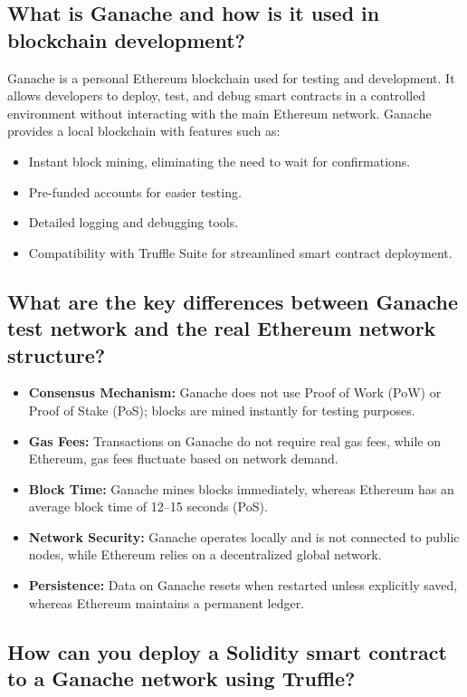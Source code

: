 \documentclass[11pt]{article}
\begin{document}
\subsection{What is Ganache and how is it used in blockchain development?}

Ganache is a personal Ethereum blockchain used for testing and development. It allows developers to deploy, test, and debug smart contracts in a controlled environment without interacting with the main Ethereum network. Ganache provides a local blockchain with features such as:
\begin{itemize}
    \item Instant block mining, eliminating the need to wait for confirmations.
    \item Pre-funded accounts for easier testing.
    \item Detailed logging and debugging tools.
    \item Compatibility with Truffle Suite for streamlined smart contract deployment.
\end{itemize}

\subsection{What are the key differences between Ganache test network and the real Ethereum network structure?}

\begin{itemize}
    \item \textbf{Consensus Mechanism:} Ganache does not use Proof of Work (PoW) or Proof of Stake (PoS); blocks are mined instantly for testing purposes.
    \item \textbf{Gas Fees:} Transactions on Ganache do not require real gas fees, while on Ethereum, gas fees fluctuate based on network demand.
    \item \textbf{Block Time:} Ganache mines blocks immediately, whereas Ethereum has an average block time of 12–15 seconds (PoS).
    \item \textbf{Network Security:} Ganache operates locally and is not connected to public nodes, while Ethereum relies on a decentralized global network.
    \item \textbf{Persistence:} Data on Ganache resets when restarted unless explicitly saved, whereas Ethereum maintains a permanent ledger.
\end{itemize}

\subsection{How can you deploy a Solidity smart contract to a Ganache network using Truffle?}
\end{document}
